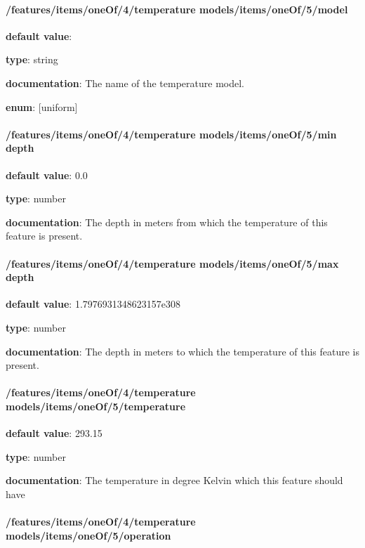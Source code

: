 \paragraph{/features/items/oneOf/4/temperature models/items/oneOf/5/model} \begin{itemized}
\item {\bf default value}: 
\item {\bf type}: string
\item {\bf documentation}: The name of the temperature model.
\item {\bf enum}: [uniform]\end{itemized}\paragraph{/features/items/oneOf/4/temperature models/items/oneOf/5/min depth} \begin{itemized}
\item {\bf default value}: 0.0
\item {\bf type}: number
\item {\bf documentation}: The depth in meters from which the temperature of this feature is present.
\end{itemized}\paragraph{/features/items/oneOf/4/temperature models/items/oneOf/5/max depth} \begin{itemized}
\item {\bf default value}: 1.7976931348623157e308
\item {\bf type}: number
\item {\bf documentation}: The depth in meters to which the temperature of this feature is present.
\end{itemized}\paragraph{/features/items/oneOf/4/temperature models/items/oneOf/5/temperature} \begin{itemized}
\item {\bf default value}: 293.15
\item {\bf type}: number
\item {\bf documentation}: The temperature in degree Kelvin which this feature should have
\end{itemized}\paragraph{/features/items/oneOf/4/temperature models/items/oneOf/5/operation} \begin{itemized}

\end{itemized}
